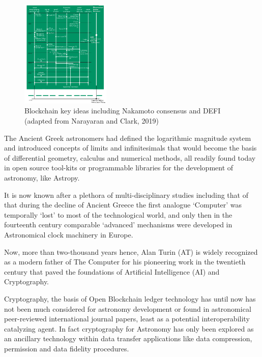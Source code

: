 \documentclass[final,5p,times,twocolumn,authoryear]{elsarticle}
\begin{document}
 \begin{figure}
    \centering
    \includegraphics[width=0.38\textwidth]{narayanan3.png}
    \vspace*{-0.3cm}
    \caption{Blockchain key ideas including Nakamoto consensus and DEFI (adapted from Narayaran and Clark, 2019)}
    \label{fig:narayanan}
\end{figure}
 
 The Ancient Greek astronomers had defined the logarithmic magnitude system and introduced concepts of limits and infinitesimals that would become the basis of differential geometry, calculus and numerical methods, all readily found today in open source tool-kits or programmable libraries for the development of astronomy, like Astropy.
 
 It is now known after a plethora of multi-disciplinary studies including that of \citet{Freeth2021} that during the decline of Ancient Greece the first analogue `Computer' was temporally `lost' to most of the technological world, and only then in the fourteenth century comparable `advanced' mechanisms were developed in Astronomical clock machinery in Europe. 
 
 Now, more than two-thousand years hence, Alan Turin (AT) is widely recognized as a modern father of The Computer for his pioneering  work in the twentieth century that paved the foundations of Artificial Intelligence (AI) and Cryptography. 
 
Cryptography, the basis of Open Blockchain ledger technology has until now has not been much considered for astronomy development or found in astronomical peer-reviewed international journal papers, least as a potential interoperability catalyzing agent. In fact cryptography for Astronomy has only been explored as an ancillary technology within data transfer applications like data compression, permission and data fidelity procedures.
\end{document}
